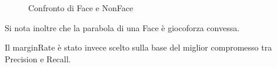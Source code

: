 \documentclass[
  italian,
]{article}
\begin{document}
\begin{figure}
\centering
{}%
\qquad
{}%
\caption{Confronto di Face e NonFace}
\end{figure}


Si nota inoltre che la parabola di una Face è giocoforza convessa.

Il marginRate è stato invece scelto sulla base del miglior compromesso
tra Precision e Recall.

\begin{figure}
\centering
{}%
\qquad
{}%
\end{figure}
\end{document}
